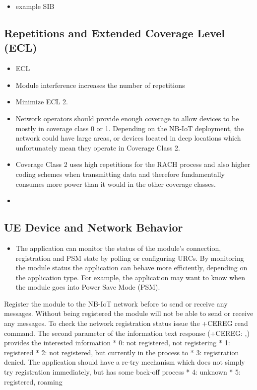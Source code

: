 \documentclass[]{article}
\providecommand{\tightlist}{%
  \setlength{\itemsep}{0pt}\setlength{\parskip}{0pt}}
\begin{document}
\begin{itemize}
\tightlist
\item
  example SIB
\end{itemize}

\hypertarget{repetitions-and-extended-coverage-level-ecl}{%
\subsection{Repetitions and Extended Coverage Level
(ECL)}\label{repetitions-and-extended-coverage-level-ecl}}

\begin{itemize}
\item
  ECL
\item
  Module interference increases the number of repetitions
\item
  Minimize ECL 2.
\item
  Network operators should provide enough coverage to allow devices to
  be mostly in coverage class 0 or 1. Depending on the NB-IoT
  deployment, the network could have large areas, or devices located in
  deep locations which unfortunately mean they operate in Coverage Class
  2.
\item
  Coverage Class 2 uses high repetitions for the RACH process and also
  higher coding schemes when transmitting data and therefore
  fundamentally consumes more power than it would in the other coverage
  classes.
\item
\end{itemize}

\hypertarget{ue-device-and-network-behavior}{%
\subsection{UE Device and Network
Behavior}\label{ue-device-and-network-behavior}}

\begin{itemize}
\tightlist
\item
  The application can monitor the status of the module's connection,
  registration and PSM state by polling or configuring URCs. By
  monitoring the module status the application can behave more
  efficiently, depending on the application type. For example, the
  application may want to know when the module goes into Power Save Mode
  (PSM).
\end{itemize}

Register the module to the NB-IoT network before to send or receive any
messages. Without being registered the module will not be able to send
or receive any messages. To check the network registration status issue
the +CEREG read command. The second parameter of the information text
response (+CEREG: ,) provides the interested information * 0: not
registered, not registering * 1: registered * 2: not registered, but
currently in the process to * 3: registration denied. The application
should have a re-try mechanism which does not simply try registration
immediately, but has some back-off process * 4: unknown * 5: registered,
roaming
\end{document}
